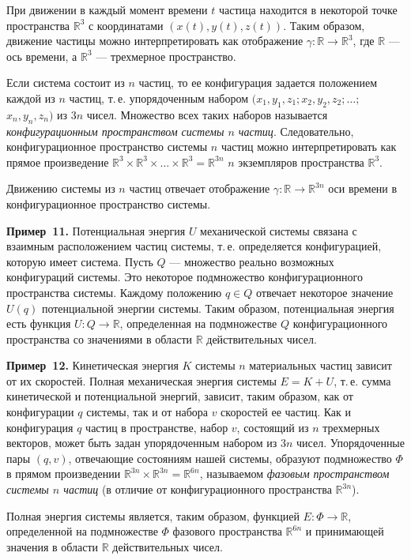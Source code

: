 При движении в каждый момент времени $t$ частица находится в некоторой точке пространства $\mathbb{R}^3$ с координатами $(x(t), y(t), z(t))$. Таким образом,
движение частицы можно интерпретировать как отображение $\gamma \colon \mathbb{R} \to \mathbb{R}^3$, где
$\mathbb{R}$ --- ось времени, а $\mathbb{R}^3$ --- трехмерное пространство.

Если система состоит из $n$ частиц, то ее конфигурация задается положением каждой из $n$ частиц, т.\,е. упорядоченным набором $(x_1, y_1, z_1; x_2, y_2, z_2; \ldots;$
$x_n, y_n, z_n)$ из $3n$ чисел. Множество всех таких наборов называется \textit{конфигурационным пространством системы $n$ частиц}. Следовательно, конфигурационное пространство системы $n$ частиц можно интерпретировать как прямое
произведение $\mathbb{R}^3 \times \mathbb{R}^3 \times \ldots \times \mathbb{R}^3 = \mathbb{R}^{3n}$ $n$ экземпляров пространства $\mathbb{R}^3$.

Движению системы из $n$ частиц отвечает отображение $\gamma \colon \mathbb{R} \to \mathbb{R}^{3n}$ оси
времени в конфигурационное пространство системы.

\textbf{Пример~11.} Потенциальная энергия $U$ механической системы связана с
взаимным расположением частиц системы, т.\,е. определяется конфигурацией, которую имеет система. Пусть $Q$ --- множество реально возможных конфигураций системы. Это некоторое подмножество конфигурационного пространства системы. Каждому положению $q \in Q$ отвечает некоторое значение
$U(q)$ потенциальной энергии системы. Таким образом, потенциальная энергия есть функция $U \colon Q \to \mathbb{R}$, определенная на подмножестве $Q$ конфигурационного пространства со значениями в области $\mathbb{R}$ действительных чисел.

\textbf{Пример~12.} Кинетическая энергия $K$ системы $n$ материальных частиц
зависит от их скоростей. Полная механическая энергия системы $E = K + U$,
т.\,е. сумма кинетической и потенциальной энергий, зависит, таким образом,
как от конфигурации $q$ системы, так и от набора $v$ скоростей ее частиц. Как
и конфигурация $q$ частиц в пространстве, набор $v$, состоящий из $n$ трехмерных векторов, может быть задан упорядоченным набором из $3n$ чисел.
Упорядоченные пары $(q, v)$, отвечающие состояниям нашей системы, образуют подмножество $\Phi$ в прямом произведении $\mathbb{R}^{3n} \times \mathbb{R}^{3n} = \mathbb{R}^{6n}$, называемом
\textit{фазовым пространством системы $n$ частиц} (в отличие от конфигурационного пространства $\mathbb{R}^{3n}$).

Полная энергия системы является, таким образом, функцией $E \colon \Phi \to \mathbb{R}$,
определенной на подмножестве $\Phi$ фазового пространства $\mathbb{R}^{6n}$ и принимающей значения в области $\mathbb{R}$ действительных чисел.

